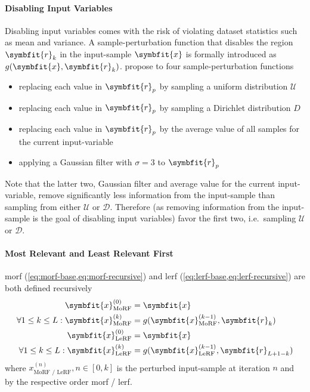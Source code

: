 \paragraph{Disabling Input Variables}
Disabling input variables comes with the risk of violating dataset statistics such as mean and variance. A sample-perturbation function that disables the region \(\symbfit{r}_k\) in the input-sample \(\symbfit{x}\) is formally introduced as \(g(\symbfit{x}, \symbfit{r}_k)\). \citeauthor{WojciechSamek.2015} propose to four sample-perturbation functions
\begin{itemize}
    \item replacing each value in \(\symbfit{r}_p\) by sampling a uniform distribution \(\mathscr U\)
    \item replacing each value in \(\symbfit{r}_p\) by sampling a Dirichlet distribution \(D\)
    \item replacing each value in \(\symbfit{r}_p\) by the average value of all samples for the current input-variable
    \item applying a Gaussian filter with \(\sigma = 3\) to \(\symbfit{r}_p\)
\end{itemize}
Note that the latter two, Gaussian filter and average value for the current input-variable, remove significantly less information from the input-sample than sampling from either \(\mathscr U\) or \(\mathscr D\).  Therefore (as removing information from the input-sample is the goal of disabling input variables) \citeauthor{WojciechSamek.2015} favor the first two, i.e.\ sampling \(\mathscr U\) or \(\mathscr D\).


\paragraph{Most Relevant and Least Relevant First}
\gls{morf} (\cref{eq:morf-base,eq:morf-recursive}) and \gls{lerf} (\cref{eq:lerf-base,eq:lerf-recursive}) are both defined recursively
\begin{align}
    \symbfit{x}^{(0)}_{\text{MoRF}} &= \symbfit{x}\label{eq:morf-base} \\
    \forall{1 \leq k \leq L}: \symbfit{x}^{(k)}_{\text{MoRF}} &= g(\symbfit{x}^{(k-1)}_{\text{MoRF}}, \symbfit{r}_k)\label{eq:morf-recursive} \\
    \symbfit{x}^{(0)}_{\text{LeRF}} &= \symbfit{x}\label{eq:lerf-base} \\
    \forall{1 \leq k \leq L}: \symbfit{x}^{(k)}_{\text{LeRF}} &= g(\symbfit{x}^{(k-1)}_{\text{LeRF}}, \symbfit{r}_{L+1-k})\label{eq:lerf-recursive}
\end{align}
where \(x^{(n)}_{\text{MoRF / LeRF}}, n \in [0, k]\) is the perturbed input-sample at iteration \(n\) and by the respective order \gls{morf} / \gls{lerf}.

